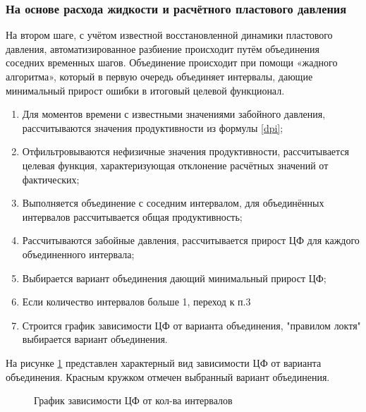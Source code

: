 \documentclass[14pt]{article}
\begin{document}
\subsubsection{На основе расхода жидкости и расчётного пластового давления}
На втором шаге, с учётом известной восстановленной динамики пластового давления, автоматизированное разбиение происходит путём объединения соседних временных шагов. Объединение происходит при помощи «жадного алгоритма», который в первую очередь объединяет интервалы, дающие минимальный прирост ошибки в итоговый целевой функционал.
\begin{enumerate}
	\item Для моментов времени с известными значениями забойного давления, рассчитываются значения продуктивности из формулы \ref{dpi}; 
	\item Отфильтровываются нефизичные значения продуктивности, рассчитывается целевая функция, характеризующая отклонение расчётных значений от фактических;
	\item Выполняется объединение с соседним интервалом, для объединённых интервалов рассчитывается общая продуктивность;
	\item Рассчитываются забойные давления, рассчитывается прирост ЦФ для каждого объединенного интервала;
	 \item Выбирается вариант объединения дающий минимальный прирост ЦФ;
	 \item Если количество интервалов больше 1, переход к п.3 
	 \item Строится график зависимости ЦФ от варианта объединения, "правилом локтя" выбирается вариант объединения.
\end{enumerate}
На рисунке \ref{fig:cJ11} представлен характерный вид зависимости ЦФ от варианта объединения. Красным кружком отмечен выбранный вариант объединения.
\begin{figure}[!htb]
	\caption{График зависимости ЦФ от кол-ва интервалов}
	\label{fig:cJ11}
\end{figure}
\end{document}
